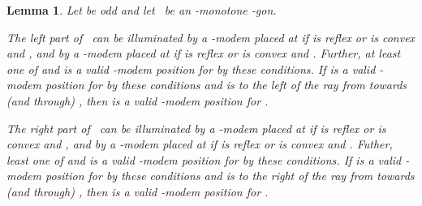 \documentclass[A4]{article}
\newtheorem{lemma}[theorem]{Lemma}
\begin{document}
\begin{lemma}\label{lem:2k+5subodd}
Let  be odd and let~ be an -monotone -gon.

The left part  of~ can be illuminated by a \mbox{-modem} placed
at  if  is reflex or  is convex and , and by a \mbox{-modem} placed
at  if  is reflex or  is convex and .
Further, at least one of  and  is a valid \mbox{-modem} position for  by these conditions.
If  is a valid \mbox{-modem} position for  by these conditions and  is to the left of the ray from  towards (and through) , then  is a valid \mbox{-modem} position for .


The right part  of~ can be illuminated by a \mbox{-modem} placed
at  if  is reflex or  is convex and , and by a \mbox{-modem} placed
at  if  is reflex or  is convex and .
Futher, least one of  and  is a valid \mbox{-modem} position for  by these conditions.
If  is a valid \mbox{-modem} position for  by these conditions and  is to the right of the ray from  towards (and through) , then  is a valid \mbox{-modem} position for .
\end{lemma}
\end{document}
